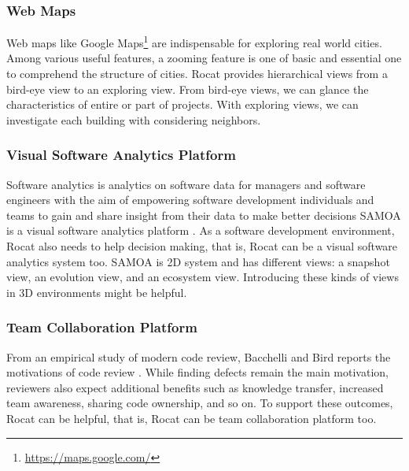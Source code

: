 \documentclass[conference]{IEEEtran}
\begin{document}
\subsubsection{Web Maps}
Web maps like \textsf{Google Maps}\footnote{\url{https://maps.google.com/}} are indispensable for exploring real world cities.
Among various useful features, a zooming feature is one of basic and essential one to comprehend the structure of cities.
\textsf{Rocat} provides hierarchical views from a bird-eye view to an exploring view.
From bird-eye views, we can glance the characteristics of entire or part of projects.
With exploring views, we can investigate each building with considering neighbors.

\subsubsection{Visual Software Analytics Platform}
Software analytics is analytics on software data for managers and software engineers with the aim of empowering software development individuals and teams to gain and share insight from their data to make better decisions \cite{Menzies:2013:SAS:2553351.2553360} \textsf{SAMOA} is a visual software analytics platform \cite{6676936}.
As a software development environment, \textsf{Rocat} also needs to help decision making, that is, \textsf{Rocat} can be a visual software analytics system too.
\textsf{SAMOA} is 2D system and has different views: a snapshot view, an evolution view, and an ecosystem view.
Introducing these kinds of views in 3D environments might be helpful.

\subsubsection{Team Collaboration Platform}
From an empirical study of modern code review, Bacchelli and Bird reports the motivations of code review \cite{Bacchelli:2013:EOC:2486788.2486882}. While finding defects remain the main motivation, reviewers also expect additional benefits such as knowledge transfer, increased team awareness, sharing code ownership, and so on.
To support these outcomes, \textsf{Rocat} can be helpful, that is, \textsf{Rocat} can be team collaboration platform too.
\end{document}
